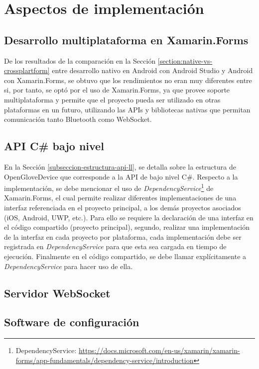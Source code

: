 \section{Aspectos de implementación}


\subsection{Desarrollo multiplataforma en Xamarin.Forms}
De los resultados de la comparación en la Sección \ref{section:native-vs-crossplartform} entre desarrollo nativo en Android con Android Studio y  Android con Xamarin.Forms, se obtuvo que los rendimientos no eran muy diferentes entre si, por tanto, se optó por el uso de Xamarin.Forms, ya que provee soporte multiplataforma y permite que el proyecto pueda ser utilizado en otras plataformas en un futuro, utilizando las APIs y bibliotecas nativas que permitan comunicación tanto Bluetooth como WebSocket.




\subsection{API C\# bajo nivel}
En la Sección \ref{subseccion-estructura-api-ll}, se detalla sobre la estructura de OpenGloveDevice que corresponde a la API de bajo nivel C\#. Respecto a la implementación, se debe mencionar el uso de \textit{DependencyService}\footnote{DependencyService: \url{https://docs.microsoft.com/en-us/xamarin/xamarin-forms/app-fundamentals/dependency-service/introduction}} de Xamarin.Forms, el cual permite realizar diferentes implementaciones de una interfaz referenciada en el proyecto principal, a los demás proyectos asociados (iOS, Android, UWP, etc.). Para ello se requiere la declaración de una interfaz en el código compartido (proyecto principal), segundo, realizar una implementación de la interfaz en cada proyecto por plataforma, cada implementación debe ser registrada en \textit{DependencyService} para que esta sea cargada en tiempo de ejecución. Finalmente en el código compartido, se debe llamar explícitamente a \textit{DependencyService} para hacer uso de ella.


\subsection{Servidor WebSocket}




\subsection{Software de configuración}



